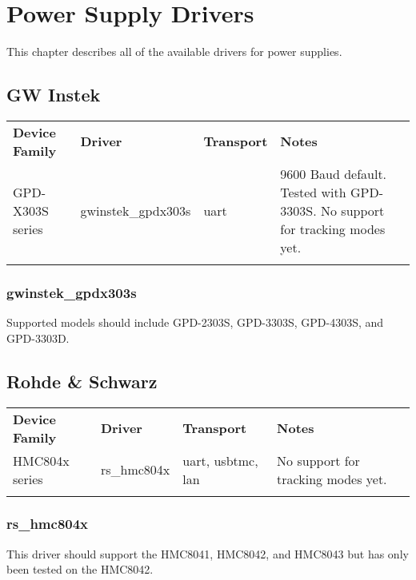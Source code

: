 \chapter{Power Supply Drivers}
\label{sec:powersupply-drivers}

This chapter describes all of the available drivers for power supplies.

\section{GW Instek}

\begin{tabularx}{16cm}{lllX}
\thickhline
\textbf{Device Family} & \textbf{Driver} & \textbf{Transport} & \textbf{Notes} \\
\thickhline
GPD-X303S series & gwinstek\_gpdx303s & uart & 9600 Baud default. Tested with GPD-3303S. No support for tracking modes yet.\\
\thickhline
\end{tabularx}

\subsection{gwinstek\_gpdx303s}

Supported models should include GPD-2303S, GPD-3303S, GPD-4303S, and GPD-3303D.

\section{Rohde \& Schwarz}

\begin{tabularx}{16cm}{lllX}
\thickhline
\textbf{Device Family} & \textbf{Driver} & \textbf{Transport} & \textbf{Notes} \\
\thickhline
HMC804x series & rs\_hmc804x & uart, usbtmc, lan & No support for tracking modes yet.\\
\thickhline
\end{tabularx}

\subsection{rs\_hmc804x}

This driver should support the HMC8041, HMC8042, and HMC8043 but has only been tested on the HMC8042.
